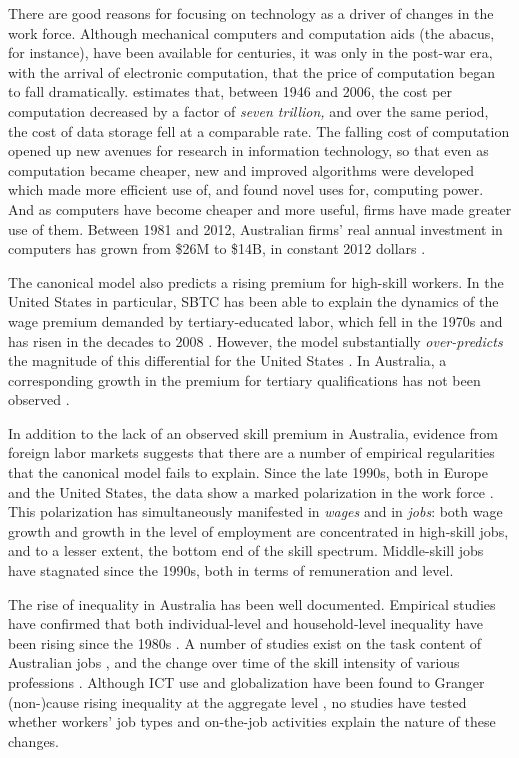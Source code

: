 There are good reasons for focusing on technology as a driver of changes in the work force. Although mechanical computers and computation aids (the abacus, for instance), have been available for centuries, it was only in the post-war era, with the arrival of electronic computation, that the price of computation began to fall dramatically. \citet{Nordhaus2007} estimates that, between 1946 and 2006, the cost per computation decreased by a factor of {\em seven trillion,} and over the same period, the cost of data storage fell at a comparable rate. The falling cost of computation opened up new avenues for research in information technology, so that even as computation became cheaper, new and improved algorithms were developed which made more efficient use of, and found novel uses for, computing power. And as computers have become cheaper and more useful, firms have made greater use of them. Between 1981 and 2012, Australian firms' real annual investment in computers has grown from \$26M to \$14B, in constant 2012 dollars \citet{ABS5206}.

The canonical model also predicts a rising premium for high-skill workers. In the United States in particular, SBTC has been able to explain the dynamics of the wage premium demanded by tertiary-educated labor, which fell in the 1970s and has risen in the decades to 2008 \citep{Acemoglu2011}. However, the model substantially \emph{over-predicts} the magnitude of this differential for the United States \citep{Autor2008}. In Australia, a corresponding growth in the premium for tertiary qualifications has not been observed \citep{Coelli2009}.

In addition to the lack of an observed skill premium in Australia, evidence from foreign labor markets suggests that there are a number of empirical regularities that the canonical model fails to explain. Since the late 1990s, both in Europe and the United States, the data show a marked polarization in the work force \citep{Goos2007, Autor2006}. This polarization has simultaneously manifested in \emph{wages} and in \emph{jobs}: both wage growth and growth in the level of employment are concentrated in high-skill jobs, and to a lesser extent, the bottom end of the skill spectrum. Middle-skill jobs have stagnated since the 1990s, both in terms of remuneration and level.

The rise of inequality in Australia has been well documented. Empirical studies have confirmed that both individual-level and household-level inequality have been rising since the 1980s \citep{Borland1999,Leigh2005,Leigh2013,Gaston2009}. A number of studies exist on the task content of Australian jobs \citep{Esposto2012a}, and the change over time of the skill intensity of various professions \citep{Esposto2012, Esposto2012a}. Although ICT use and globalization have been found to Granger (non-)cause rising inequality at the aggregate level \citep{Gaston2009}, no studies have tested whether workers' job types and on-the-job activities explain the nature of these changes.


